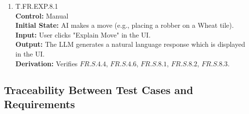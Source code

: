 \documentclass[12pt, titlepage]{article}
\begin{document}
\begin{enumerate}
    \item{\hypertarget{T.FR.EXP.8.1}{T.FR.EXP.8.1}\\}
    \textbf{Control:} Manual \\
    \textbf{Initial State:} AI makes a move (e.g., placing a robber on a Wheat tile). \\
    \textbf{Input:} User clicks "Explain Move" in the UI. \\
    \textbf{Output:} The LLM generates a natural language response which is displayed in the UI.\\
    \textbf{Derivation:} Verifies $\hyperref[FR.S.4.4]{FR.S.4.4}$, $\hyperref[FR.S.4.6]{FR.S.4.6}$, $\hyperref[FR.S.8.1]{FR.S.8.1}$, $\hyperref[FR.S.8.2]{FR.S.8.2}$, $\hyperref[FR.S.8.3]{FR.S.8.3}$.
\end{enumerate}

\subsection{Traceability Between Test Cases and Requirements}
\end{document}
